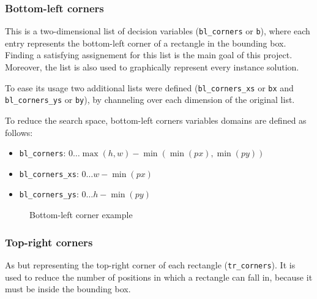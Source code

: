 \documentclass[a4paper,10pt]{article}
\begin{document}
\subsubsection*{Bottom-left corners} \label{sec:bottom-left-corners}
This is a two-dimensional list of decision variables (\texttt{bl\_corners} or \texttt{b}), where each entry represents the bottom-left corner of a rectangle in the bounding box. Finding a satisfying assignement for this list is the main goal of this project. Moreover, the list is also used to graphically represent every instance solution.

To ease its usage two additional lists were defined (\texttt{bl\_corners\_xs} or \texttt{bx} and \texttt{bl\_corners\_ys} or \texttt{by}), by channeling over each dimension of the original list.

To reduce the search space, bottom-left corners variables domains are defined as follows:
\begin{itemize}
   \item \texttt{bl\_corners}: $0 \dots \max({h, w}) - \min({\min({px}), \min({py})})$
   \item \texttt{bl\_corners\_xs}: $0 \dots w - \min({px})$
   \item \texttt{bl\_corners\_ys}: $0 \dots h - \min({py})$
\end{itemize}

\begin{figure}[h]
   \centering
   \caption{Bottom-left corner example}
\end{figure}

\subsubsection*{Top-right corners}
As  but representing the top-right corner of each rectangle (\texttt{tr\_corners}). It is used to reduce the number of positions in which a rectangle can fall in, because it must be inside the bounding box.
\end{document}
